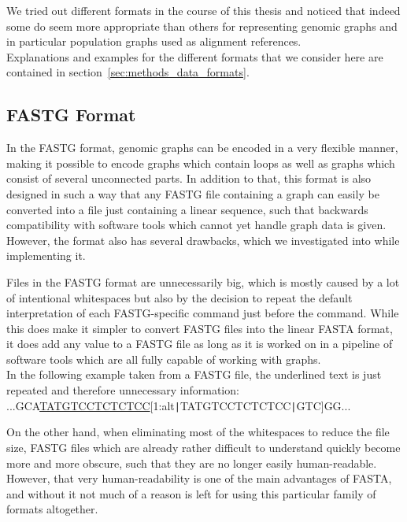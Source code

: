 \documentclass[a4paper,12pt,twoside,BCOR=10mm]{scrbook}
\def\pipe{\texttt{|}}
\begin{document}
We tried out different formats in the course of this thesis 
and noticed that indeed some do seem more appropriate than others 
for representing genomic graphs 
and in particular population graphs used as alignment references. \\
Explanations and examples for the different formats that we consider here 
are contained in section~\ref{sec:methods_data_formats}. 

\subsection{FASTG Format}

In the FASTG format, genomic graphs can be encoded in a very flexible manner, 
making it possible to encode graphs which contain loops as well as graphs 
which consist of several unconnected parts. 
In addition to that, this format is also designed in such a way that any 
FASTG file containing a graph can easily be converted into a file just containing 
a linear sequence, such that backwards compatibility with software tools which 
cannot yet handle graph data is given. \\
However, the format also has several drawbacks, which we investigated into 
while implementing it.

Files in the FASTG format are unnecessarily big, which is mostly caused 
by a lot of intentional whitespaces but also by the decision to repeat the 
default interpretation of each FASTG-specific command just before the command. 
While this does make it simpler to convert FASTG files into the linear FASTA format, 
it does add any value to a FASTG file as long as it is worked on in a pipeline of 
software tools which are all fully capable of working with graphs. \\
In the following example taken from a FASTG file, the underlined 
text is just repeated and therefore unnecessary information: \\
...GCA\underline{TATGTCCTCTCTCC}[1:alt\pipe TATGTCCTCTCTCC\pipe GTC]GG...

On the other hand, when eliminating most of the whitespaces to reduce the file size, 
FASTG files which are already rather difficult to understand quickly 
become more and more obscure, such that they are no longer easily human-readable. 
However, that very human-readability is one of the main advantages of FASTA, 
and without it not much of a reason is left for using this particular family 
of formats altogether.
\end{document}
